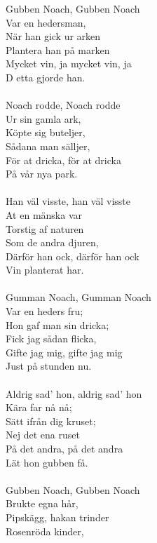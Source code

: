 \vspace{10pt}
\revrpt Gubben Noach, Gubben Noach\\ 
Var en hedersman,\rpt \\ 
När han gick ur arken\\ 
Plantera han på marken\\ 
Mycket vin, ja mycket vin, ja\\ 
D etta gjorde han.\\ 
\\ 
\revrpt Noach rodde, Noach rodde\\ 
Ur sin gamla ark,\rpt \\ 
Köpte sig buteljer,\\ 
Sådana man sälljer,\\ 
För at dricka, för at dricka\\ 
På vår nya park.\\ 
\\  
\revrpt Han väl visste, han väl visste\\ 
At en mänska var\rpt \\ 
Torstig af naturen\\ 
Som de andra djuren,\\ 
Därför han ock, därför han ock\\ 
Vin planterat har.\\ 
 \\ 
\revrpt Gumman Noach, Gumman Noach\\ 
Var en heders fru;\rpt \\ 
Hon gaf man sin dricka;\\ 
Fick jag sådan flicka,\\ 
Gifte jag mig, gifte jag mig\\ 
Just på stunden nu.\\ 
 \\ 
\revrpt Aldrig sad' hon, aldrig sad' hon\\ 
Kära far nå nå;\rpt \\ 
Sätt ifrån dig kruset;\\ 
Nej det ena ruset\\ 
På det andra, på det andra\\ 
Lät hon gubben få.\\ 
 \\ 
\revrpt Gubben Noach, Gubben Noach\\ 
Brukte egna hår,\rpt \\ 
Pipskägg, hakan trinder\\ 
Rosenröda kinder,\\ 
